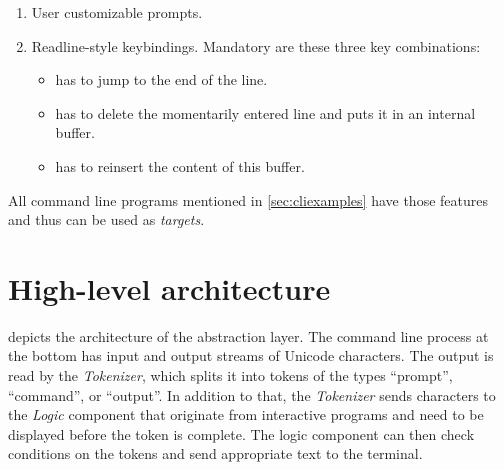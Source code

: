 \documentclass[paper=a4,twoside,abstract=on,cleardoublepage=empty,numbers=noenddot,toc=bib,12pt,appendixprefix=true]{scrreprt}
\begin{document}
\begin{enumerate}
    \item User customizable prompts.
    \item Readline-style keybindings. Mandatory are these three key combinations:
        \begin{itemize}
            \item {} has to jump to the end of the line.
            \item {} has to delete the momentarily entered line and puts it in an internal buffer.
            \item {} has to reinsert the content of this buffer.
        \end{itemize}
\end{enumerate}

All command line programs mentioned in \cref{sec:cliexamples} have those features and thus can be used as \emph{targets}.

\section{High-level architecture}

 depicts the architecture of the abstraction layer. The command line process at the bottom has input and output streams of Unicode characters. The output is read by the \emph{Tokenizer}, which splits it into tokens of the types “prompt”, “command”, or “output”. In addition to that, the \emph{Tokenizer} sends characters to the \emph{Logic} component that originate from interactive programs and need to be displayed before the token is complete. The logic component can then check conditions on the tokens and send appropriate text to the terminal.
\end{document}

